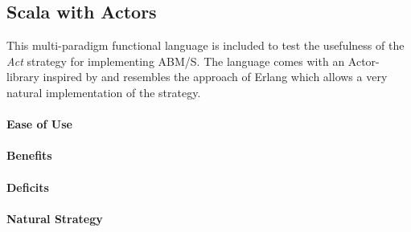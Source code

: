 \subsection{Scala with Actors}
This multi-paradigm functional language is included to test the usefulness of the \textit{Act} strategy for implementing ABM/S. The language comes with an Actor-library inspired by \cite{agha_actors:_1986} and resembles the approach of Erlang which allows a very natural implementation of the strategy.

\paragraph{Ease of Use}

\paragraph{Benefits}

\paragraph{Deficits}

\paragraph{Natural Strategy}